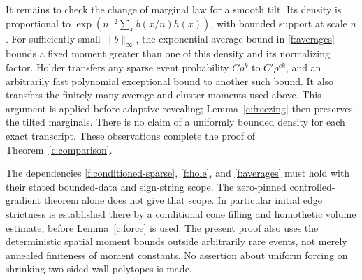 It remains to check the change of marginal law for a smooth tilt.
Its density is proportional to
$\exp(n^{-2}\sum_x b(x/n)h(x))$, with bounded support at scale $n$.
For sufficiently small $\|b\|_\infty$, the exponential average
bound in \ref{f:averages} bounds a fixed moment greater than one
of this density and its normalizing factor. Holder transfers any
sparse event probability $C\rho^k$ to $C'\rho^{c k}$, and an
arbitrarily fast polynomial exceptional bound to another such
bound. It also transfers the finitely many average and cluster
moments used above. This argument is applied before adaptive
revealing; Lemma~\ref{c:freezing} then preserves the tilted marginals.
There is no claim of a uniformly bounded density for each exact
transcript. These observations complete the proof of
Theorem~\ref{c:comparison}.

\begin{remark}\label{c:scope}
The dependencies \ref{f:conditioned-sparse}, \ref{f:hole}, and \ref{f:averages}
must hold with their stated bounded-data and sign-string scope.
The zero-pinned controlled-gradient theorem alone does not give
that scope. In particular initial edge strictness is established
there by a conditional cone filling and homothetic volume estimate,
before Lemma~\ref{c:force} is used. The present proof also uses the
deterministic spatial moment bounds outside arbitrarily rare events,
not merely annealed finiteness of moment constants. No assertion
about uniform forcing on shrinking two-sided wall polytopes is made.
\end{remark}
